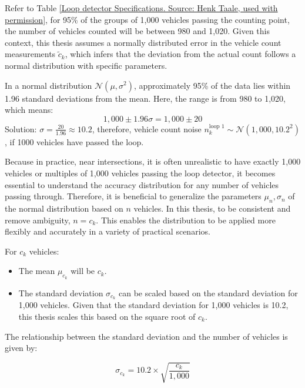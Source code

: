 Refer to Table \ref{Loop detector Specifications. Source: Henk Taale, used with permission}, for 95\% of the groups of 1,000 vehicles passing the counting point, the number of vehicles counted will be between 980 and 1,020. Given this context, this thesis assumes a normally distributed error in the vehicle count measurements $\tilde c_k$, which infers that the deviation from the actual count follows a normal distribution with specific parameters.

In a normal distribution $\mathcal{N}(\mu,\sigma^2)$, approximately 95\% of the data lies within 1.96 standard deviations from the mean. Here, the range is from 980 to 1,020, which means:
\begin{equation}
    1,000 \pm 1.96 \sigma =1,000 \pm 20
\end{equation}
Solution: $\sigma = \frac{20}{1.96} \approx 10.2$, therefore, vehicle count noise $n_k^\text{loop 1} \sim \mathcal{N}(1,000, 10.2^2)$, if 1000 vehicles have passed the loop. 

Because in practice, near intersections, it is often unrealistic to have exactly 1,000 vehicles or multiples of 1,000 vehicles passing the loop detector, it becomes essential to understand the accuracy distribution for any number of vehicles passing through. Therefore, it is beneficial to generalize the parameters $\mu_n, \sigma_n$ of the normal distribution based on $n$ vehicles. In this thesis, to be consistent and remove ambiguity, $n = c_k$. This enables the distribution to be applied more flexibly and accurately in a variety of practical scenarios.


For \(c_k\) vehicles:
\begin{itemize}
    \item The mean \(\mu_{c_k}\) will be \(c_k\).
    \item The standard deviation \(\sigma_{c_k}\) can be scaled based on the standard deviation for 1,000 vehicles. Given that the standard deviation for 1,000 vehicles is 10.2, this thesis scales this based on the square root of \(c_k\).
\end{itemize}

The relationship between the standard deviation and the number of vehicles is given by:

\begin{equation}
    \sigma_{c_k} = 10.2 \times \sqrt{\frac{c_k}{1,000}}
\end{equation}

